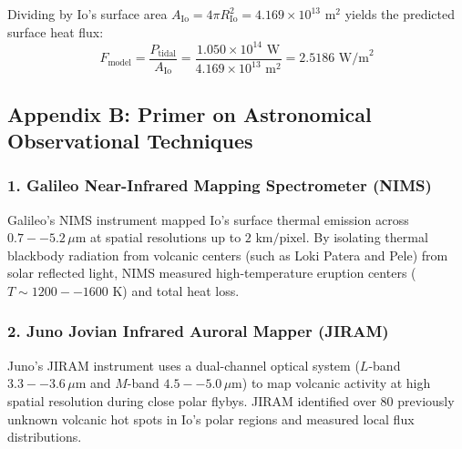 \documentclass[11pt,a4paper]{article}
\begin{document}
Dividing by Io's surface area $A_{\text{Io}} = 4 \pi R_{\text{Io}}^2 = 4.169 \times 10^{13}\text{ m}^2$ yields the predicted surface heat flux:
\begin{equation}
F_{\text{model}} = \frac{P_{\text{tidal}}}{A_{\text{Io}}} = \frac{1.050 \times 10^{14}\text{ W}}{4.169 \times 10^{13}\text{ m}^2} = 2.5186\text{ W/m}^2
\end{equation}

\subsection*{Appendix B: Primer on Astronomical Observational Techniques}

\subsubsection*{1. Galileo Near-Infrared Mapping Spectrometer (NIMS)}
Galileo's NIMS instrument mapped Io's surface thermal emission across $0.7--5.2\,\mu\text{m}$ at spatial resolutions up to $2\text{ km/pixel}$. By isolating thermal blackbody radiation from volcanic centers (such as Loki Patera and Pele) from solar reflected light, NIMS measured high-temperature eruption centers ($T \sim 1200--1600\text{ K}$) and total heat loss.

\subsubsection*{2. Juno Jovian Infrared Auroral Mapper (JIRAM)}
Juno's JIRAM instrument uses a dual-channel optical system ($L$-band $3.3--3.6\,\mu\text{m}$ and $M$-band $4.5--5.0\,\mu\text{m}$) to map volcanic activity at high spatial resolution during close polar flybys. JIRAM identified over 80 previously unknown volcanic hot spots in Io's polar regions and measured local flux distributions.
\end{document}
